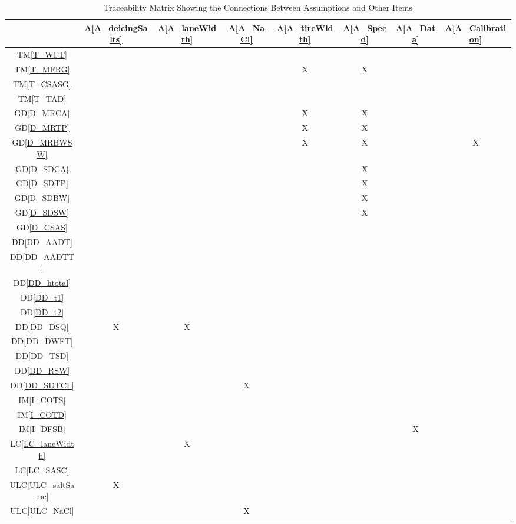 \documentclass[12pt]{article}
\newcommand{\dref}[1]{GD\ref{#1}}
\newcommand{\ddref}[1]{DD\ref{#1}}
\newcommand{\tref}[1]{TM\ref{#1}}
\newcommand{\aref}[1]{A\ref{#1}}
\newcommand{\iref}[1]{IM\ref{#1}}
\newcommand{\lcref}[1]{LC\ref{#1}}
\newcommand{\ulcref}[1]{ULC\ref{#1}}
\begin{document}
\noindent
\begin{table}[H]
\centering
\begin{tabular}{|c|c|c|c|c|c|c|c|}
\hline
	& \aref{A_deicingSalts}& \aref{A_laneWidth}& \aref{A_NaCl} & \aref{A_tireWidth} & \aref{A_Speed} & \aref{A_Data} & \aref{A_Calibration} \\
\hline
\tref{T_WFT}       & & & & & &  &   \\ \hline
\tref{T_MFRG}      & & & & X & X &  &  \\ \hline
\tref{T_CSASG}        & & & & & &  & \\ \hline
\tref{T_TAD}        & & & & & & &\\ \hline
\dref{D_MRCA}          & & & & X & X &  &  \\ \hline
\dref{D_MRTP}          & & & & X & X &  &  \\ \hline
\dref{D_MRBWSW}          & & & & X & X &  & X  \\ \hline
\dref{D_SDCA}            & & & & & X &  &  \\ \hline
\dref{D_SDTP}            & & & & & X &  &  \\ \hline
\dref{D_SDBW}            & & & & & X &  &  \\ \hline
\dref{D_SDSW}            & & & & & X &  &  \\ \hline
\dref{D_CSAS}       & & & & & & & \\ \hline
\ddref{DD_AADT}  & & & & & & & \\ \hline
\ddref{DD_AADTT}  & & & & & & & \\ \hline
\ddref{DD_htotal}  & & & & & & & \\ \hline
\ddref{DD_t1}  & & & & & & & \\ \hline
\ddref{DD_t2}  & & & & & & & \\ \hline
\ddref{DD_DSQ}   & X & X &  &  & & &  \\ \hline
\ddref{DD_DWFT}    & & & & & & & \\ \hline
\ddref{DD_TSD}    & & & & & & & \\ \hline
\ddref{DD_RSW}    & & & & & & & \\ \hline
\ddref{DD_SDTCL}    & & & X & & & &\\ \hline
\iref{I_COTS}       & & & & & & & \\ \hline
\iref{I_COTD}       & & & & & & & \\ \hline
\iref{I_DFSB}       & & & & & & X & \\ \hline
\lcref{LC_laneWidth}     & & X & & & &  & \\ \hline
\lcref{LC_SASC}   & & & & & & & \\ \hline
\ulcref{ULC_saltSame}   & X & & & & &  &\\ \hline
\ulcref{ULC_NaCl}   & & & X & & &  & \\ \hline

\hline
\end{tabular}
\caption{Traceability Matrix Showing the Connections Between Assumptions and Other Items}
\label{Table:A_others}
\end{table}
\end{document}
